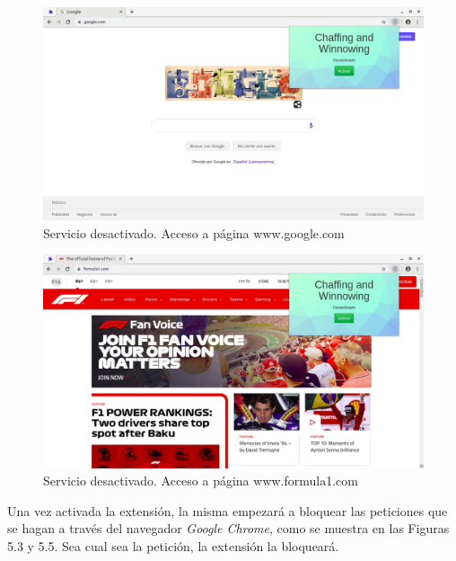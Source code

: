 \documentclass[12pt, a4paper, titlepage]{report}
\begin{document}
            \begin{figure}[H]
        		\begin{center}	\includegraphics[width=13cm]{./imagenes/Pruebas/Prototipo_1/P_desactivado1.jpeg}
        			\caption{Servicio desactivado. Acceso a página www.google.com}
        		\end{center}
        	\end{figure}
        	
        	\begin{figure}[H]
        		\begin{center}	\includegraphics[width=13cm]{./imagenes/Pruebas/Prototipo_1/P_desactivado2.jpeg}
        			\caption{Servicio desactivado. Acceso a página www.formula1.com}
        		\end{center}
        	\end{figure}
        	
        	Una vez activada la extensión, la misma empezará a bloquear las peticiones que se hagan a través del navegador \textit{Google Chrome}, como se muestra en las Figuras 5.3 y 5.5. Sea cual sea la petición, la extensión la bloqueará.
        	
\end{document}
